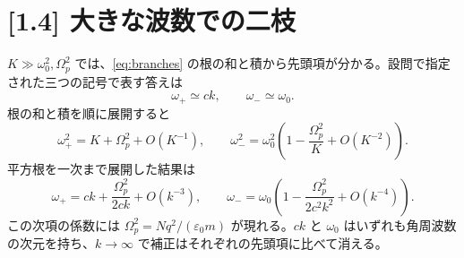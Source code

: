 \documentclass[11pt,a4paper]{article}
\begin{document}
\section*{[1.4] 大きな波数での二枝}
$K\gg\omega_0^2,\Omega_p^2$ では、\eqref{eq:branches} の根の和と積から先頭項が分かる。設問で指定された三つの記号で表す答えは
\begin{equation}
\boxed{\omega_+\simeq ck,\qquad\omega_-\simeq\omega_0}.
\end{equation}
根の和と積を順に展開すると
\begin{equation}
\omega_+^2=K+\Omega_p^2+O(K^{-1}),\qquad
\omega_-^2=\omega_0^2\left(1-\frac{\Omega_p^2}{K}+O(K^{-2})\right).
\end{equation}
平方根を一次まで展開した結果は
\begin{equation}
\omega_+=ck+\frac{\Omega_p^2}{2ck}+O(k^{-3}),\qquad
\omega_-=\omega_0\left(1-\frac{\Omega_p^2}{2c^2k^2}+O(k^{-4})\right).
\label{eq:highk}
\end{equation}
この次項の係数には $\Omega_p^2=Nq^2/(\varepsilon_0m)$ が現れる。$ck$ と $\omega_0$ はいずれも角周波数の次元を持ち、$k\to\infty$ で補正はそれぞれの先頭項に比べて消える。
\end{document}
